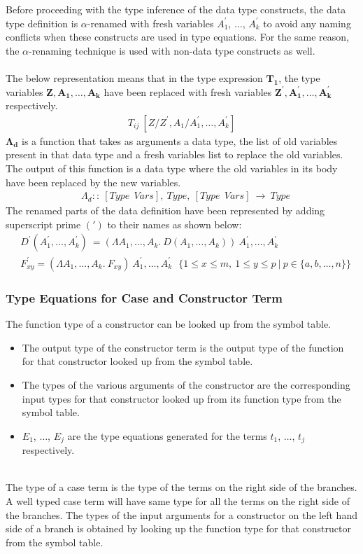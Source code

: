 \documentclass[11pt]{article}
\begin{document}
Before proceeding with the type inference of the data type constructs, the data type definition is $\alpha$-renamed with fresh variables $A_1^{\prime}$, $\ldots$, $A_k^{\prime}$ to avoid any naming conflicts when these constructs are used in type equations. For the same reason, the $\alpha$-renaming technique is used with non-data type constructs as well.
~~\\~~\\ 
The below representation means that in the type expression $\mathbf{T_1}$, the type variables $\mathbf{Z,A_1,\ldots,A_k}$ have been replaced with fresh variables $\mathbf{Z^\prime,A_1^\prime,\ldots,A_k^\prime}$ respectively.
\begin{align*}
T_{ij}~[Z/Z^\prime,A_1/A_1^{\prime},\ldots,A_k^{\prime}]
\end{align*}
$\mathbf{\Lambda_d}$ is a function that takes as arguments a data type, the list of old variables present in that data type and a fresh variables list to replace the old variables. The output of this function is a data type where the old variables in its body have been replaced by the new variables.
\begin{align*}
& \Lambda_d ::~[Type~~Vars],~Type,~[Type~~Vars]~\to~Type 
\end{align*}
The renamed parts of the data definition have been represented by adding superscript prime $(\mathbf{\prime})$ to their names as shown below:
\begin{align*}
& D^\prime(A_1^{\prime},\ldots,A_k^{\prime}) ~ = (\Lambda A_1,\ldots,A_k.~ D(A_1,\ldots,A_k))~A_1^{\prime},\ldots,A_k^{\prime}\\
& F_{xy}^\prime = (\Lambda A_1,\ldots,A_k.~F_{xy})~A_1^{\prime},\ldots,A_k^{\prime} 
 ~~~  \{1 \leq x \leq m,~1 \leq y \leq p ~|~ p \in \{a,b,\ldots,n\} \} 
\end{align*}
\subsubsection {Type Equations for Case and Constructor Term} 
The function type of a constructor can be looked up from the symbol table.
\begin{itemize}
  \item The output type of the {\sf constructor} term is the output type of the function for that constructor looked up from the symbol table. 
  \item The types of the various arguments of the constructor are the corresponding input types  for that constructor looked up from its function type from the symbol table.
  \item $E_1$, $\ldots$, $E_j$ are the type equations generated for the terms $t_1$, $\ldots$, $t_j$ respectively.
\end{itemize}
~~\\
The type of a {\sf case} term is the type of the terms on the right side of the branches. A well typed case term will have same type for all the terms on the right side of the branches. The types of the input arguments for a constructor on the left hand side of a branch is obtained by looking up the function type for that constructor from the symbol table. 
\end{document}
